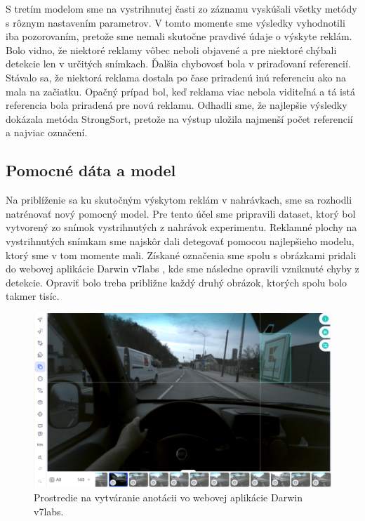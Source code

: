 S tretím modelom sme na vystrihnutej časti zo záznamu vyskúšali všetky metódy s rôznym nastavením parametrov. V tomto momente sme výsledky vyhodnotili iba pozorovaním, pretože sme nemali skutočne pravdivé údaje o výskyte reklám. Bolo vidno, že niektoré reklamy vôbec neboli objavené a pre niektoré chýbali detekcie len v určitých snímkach. Ďalšia chybovosť bola v priraďovaní referencií. Stávalo sa, že niektorá reklama dostala po čase priradenú inú referenciu ako na mala na začiatku. Opačný prípad bol, keď reklama viac nebola viditeľná a tá istá referencia bola priradená pre novú reklamu. Odhadli sme, že najlepšie výsledky dokázala metóda StrongSort, pretože na výstup uložila najmenší počet referencií a najviac označení.

\subsection{Pomocné dáta a model}

Na priblíženie sa ku skutočným výskytom reklám v nahrávkach, sme sa rozhodli natrénovať nový pomocný model. Pre tento účel sme pripravili dataset, ktorý bol vytvorený zo snímok vystrihnutých z nahrávok experimentu. Reklamné plochy na vystrihnutých snímkam sme najskôr dali detegovať pomocou najlepšieho modelu, ktorý sme v tom momente mali. Získané označenia sme spolu s obrázkami pridali do webovej aplikácie Darwin v7labs \cite{v7}, kde sme následne opravili vzniknuté chyby z detekcie. Opraviť bolo treba približne každý druhý obrázok, ktorých spolu bolo takmer tisíc.
\newpage
\begin{figure}[ht]
     \centering
     \includegraphics[width=1\textwidth]{images/04/lab.png}
     \caption{Prostredie na vytváranie anotácii vo webovej aplikácie Darwin v7labs.}
     \label{img:lab}
 \end{figure}

